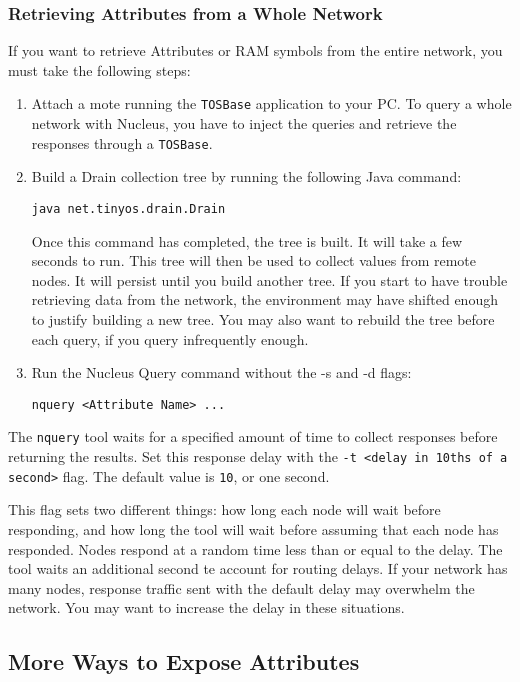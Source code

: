 \documentclass{article}
\begin{document}
\subsubsection{Retrieving Attributes from a Whole Network}

If you want to retrieve Attributes or RAM symbols from the entire
network, you must take the following steps:

\begin{enumerate}
\item Attach a mote running the {\tt TOSBase} application to your
PC. To query a whole network with Nucleus, you have to inject the
queries and retrieve the responses through a {\tt TOSBase}.
\item Build a Drain collection tree by running the following Java
command: 
\begin{verbatim}
java net.tinyos.drain.Drain
\end{verbatim}
Once this command has completed, the tree is built. It will take a few
seconds to run. This tree will then be used to collect values from
remote nodes. It will persist until you build another tree. If you
start to have trouble retrieving data from the network, the
environment may have shifted enough to justify building a new
tree. You may also want to rebuild the tree before each query, if you
query infrequently enough.
\item Run the Nucleus Query command without the {-s} and {-d} flags:
\begin{verbatim}
nquery <Attribute Name> ...
\end{verbatim}
\end{enumerate}

The {\tt nquery} tool waits for a specified amount of time to collect
responses before returning the results. Set this response delay with
the {\tt -t <delay in 10ths of a second>} flag. The default value is
{\tt 10}, or one second. 

This flag sets two different things: how long each node will wait
before responding, and how long the tool will wait before assuming
that each node has responded. Nodes respond at a random time less than
or equal to the delay. The tool waits an additional second te account
for routing delays. If your network has many nodes, response traffic
sent with the default delay may overwhelm the network. You may want to
increase the delay in these situations.

\subsection{More Ways to Expose Attributes}
\end{document}
